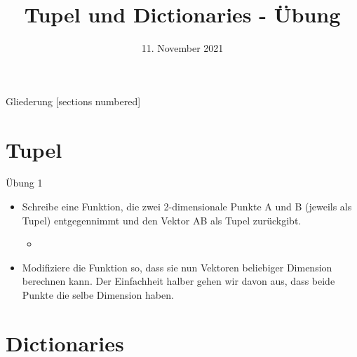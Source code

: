 



\title{Tupel und Dictionaries - Übung}
\date{11. November 2021}


\maketitle

\begin{frame}{Gliederung}
	[sections numbered]
	\tableofcontents
\end{frame}


\section{Tupel}

\begin{frame}{Übung 1}
	\begin{itemize}
		\item[\textbf{1.}] Schreibe eine Funktion, die zwei 2-dimensionale Punkte A und B (jeweils als Tupel) entgegennimmt und den Vektor AB als Tupel zurückgibt.
		\begin{itemize}
			\item[\textbf{Bsp.:}]
		\end{itemize}
		\item[\textbf{2.}] Modifiziere die Funktion so, dass sie nun Vektoren beliebiger Dimension berechnen kann. Der Einfachheit halber gehen wir davon aus, dass beide Punkte die selbe Dimension haben.
	\end{itemize}
\end{frame}

\section{Dictionaries}

